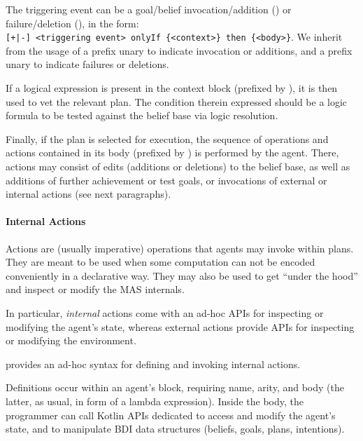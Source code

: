 The triggering event can be
a goal/belief invocation/addition (\kotlinInline{+}) or failure/deletion (\kotlinInline{-}),
in the form:
{\texttt{[+|-]~<triggering~event>~onlyIf~\{<context>\}~then~\{<body>\}}}.
%
We inherit from \jason{} the usage of a prefix unary \kotlinInline{+} to indicate invocation or additions,
and a prefix unary \kotlinInline{-} to indicate failures or deletions.

If a logical expression is present in the context block (prefixed by ),
it is then used to vet the relevant plan.
%
The condition therein expressed should be a logic formula to be tested against the belief base
via logic resolution.

Finally, if the plan is selected for execution,
the sequence of operations and actions contained in its body
(prefixed by ) is performed by the agent.
%
There, actions may consist of edits (additions or deletions) to the belief base,
as well as additions of further achievement or test goals,
or invocations of external or internal actions (see next paragraphs).
%

%

\paragraph{Internal Actions}

Actions are (usually imperative) operations
that agents may invoke within plans.
%
They are meant to be used when some computation
can not be encoded conveniently in a declarative way.
%
They may also be used to get ``under the hood''
and inspect or modify the \ac{MAS} internals.

In particular, \emph{internal} actions
come with an ad-hoc \acp{API} for inspecting or modifying the agent's state,
whereas external actions provide \acp{API} for inspecting or modifying the environment.

\jakta{} provides an ad-hoc syntax for defining and invoking internal actions.

Definitions occur within an agent's  block,
requiring name, arity, and body
(the latter, as usual, in form of a lambda expression).
%
Inside the body,
the programmer can call
Kotlin \acp{API} dedicated to access and modify the agent's state,
and to manipulate \ac{BDI} data structures (beliefs, goals, plans, intentions).

